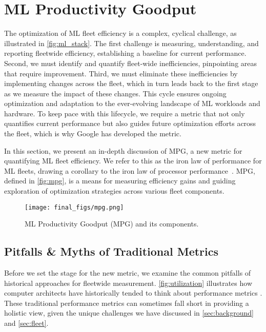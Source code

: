 \section{ML Productivity Goodput}\label{sec:goodput}

The optimization of ML fleet efficiency is a complex, cyclical challenge, as illustrated in \autoref{fig:ml_stack}. The first challenge is measuring, understanding, and reporting fleetwide efficiency, establishing a baseline for current performance. Second, we must identify and quantify fleet-wide inefficiencies, pinpointing areas that require improvement. Third, we must eliminate these inefficiencies by implementing changes across the fleet, which in turn leads back to the first stage as we measure the impact of these changes. This cycle ensures ongoing optimization and adaptation to the ever-evolving landscape of ML workloads and hardware. To keep pace with this lifecycle, we require a metric that not only quantifies current performance but also guides future optimization efforts across the fleet, which is why Google has developed the \mpg metric. %

In this section, we present an in-depth discussion of MPG, a new metric for quantifying ML fleet efficiency. We refer to this as the iron law of performance for ML fleets, drawing a corollary to the iron law of processor performance~\cite{emer1984ironlaw}. MPG, defined in \autoref{fig:mpg}, is a means for measuring efficiency gains and guiding exploration of optimization strategies across various fleet components.


\begin{figure}[t!]
    \centering
    \texttt{[image: final\_figs/mpg.png]}
    \caption{ML Productivity Goodput (MPG) and its components.}
    \label{fig:mpg}
\end{figure}





\subsection{Pitfalls \& Myths of Traditional Metrics}


Before we set the stage for the new metric, we examine the common pitfalls of historical approaches for fleetwide measurement. \autoref{fig:utilization} illustrates how computer architects have historically tended to think about performance metrics \cite{li2023analyzing, mars2011bubble,kanev2015profiling}. These traditional performance metrics can sometimes fall short in providing a holistic view, given the unique challenges we have discussed in \autoref{sec:background} and \autoref{sec:fleet}. 





